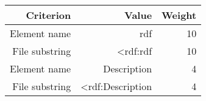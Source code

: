 \begin{tabular}{|r|r|r|}
\hline
\bf Criterion&\bf Value&\bf Weight\\
\hline
Element name&rdf&10\\
\hline
File substring&<rdf:rdf&10\\
\hline
Element name&Description&4\\
\hline
File substring&<rdf:Description&4\\
\hline
\end{tabular}
